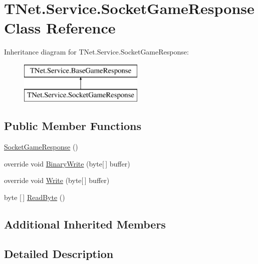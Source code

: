 \hypertarget{class_t_net_1_1_service_1_1_socket_game_response}{}\section{T\+Net.\+Service.\+Socket\+Game\+Response Class Reference}
\label{class_t_net_1_1_service_1_1_socket_game_response}


 


Inheritance diagram for T\+Net.\+Service.\+Socket\+Game\+Response\+:\begin{figure}[H]
\begin{center}
\leavevmode
\includegraphics[height=2.000000cm]{class_t_net_1_1_service_1_1_socket_game_response}
\end{center}
\end{figure}
\subsection*{Public Member Functions}
\begin{DoxyCompactItemize}
\item 
\mbox{\hyperlink{class_t_net_1_1_service_1_1_socket_game_response_a0e65aeca0998b2a1a0026000f3703704}{Socket\+Game\+Response}} ()
\item 
override void \mbox{\hyperlink{class_t_net_1_1_service_1_1_socket_game_response_a775270418861d86bc30023938da2c2f9}{Binary\+Write}} (byte\mbox{[}$\,$\mbox{]} buffer)
\item 
override void \mbox{\hyperlink{class_t_net_1_1_service_1_1_socket_game_response_a0c3fe7867f34f833a10958c230197f20}{Write}} (byte\mbox{[}$\,$\mbox{]} buffer)
\item 
byte \mbox{[}$\,$\mbox{]} \mbox{\hyperlink{class_t_net_1_1_service_1_1_socket_game_response_acde76a428c8e8219e3f29047f8b9e4d6}{Read\+Byte}} ()
\end{DoxyCompactItemize}
\subsection*{Additional Inherited Members}


\subsection{Detailed Description}




